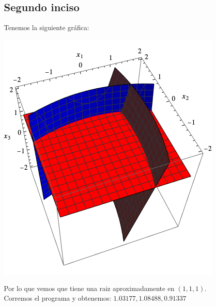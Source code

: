 \documentclass{article}
\begin{document}
\subsection{Segundo inciso}
Tenemos la siguiente gráfica:
\begin{center}
    \includegraphics[scale=0.5]{grafica2.png}    
\end{center}
Por lo que vemos que tiene una raiz aproximadamente en $(1, 1, 1)$.\\
Corremos el programa y obtenemos: ${1.03177,1.08488,0.91337}$
\end{document}
